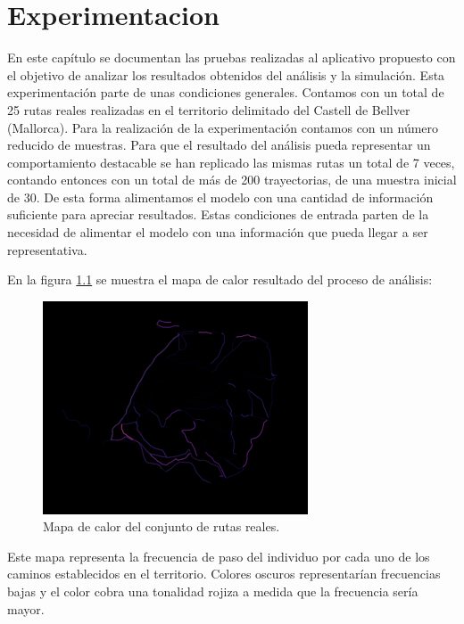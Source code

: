 \chapter{Experimentacion}
En este capítulo se documentan las pruebas realizadas al aplicativo propuesto con el objetivo de analizar los resultados obtenidos del análisis y la simulación.
Esta experimentación parte de unas condiciones generales. Contamos con un total de 25 rutas reales realizadas en el territorio delimitado del Castell de Bellver (Mallorca). Para la realización de la experimentación contamos con un número reducido de muestras. Para que el resultado del análisis pueda representar un comportamiento destacable se han replicado las mismas rutas un total de 7 veces, contando entonces con un total de más de 200 trayectorias, de una muestra inicial de 30. De esta forma alimentamos el modelo con una cantidad de información suficiente para apreciar resultados. Estas condiciones de entrada parten de la necesidad de alimentar el modelo con una información que pueda llegar a ser representativa.

En la figura \ref{figure:RealHeatMap} se muestra el mapa de calor resultado del proceso de análisis:
\begin{figure}[!htb]
\begin{center}
\includegraphics[width=0.7\textwidth]{./Imagenes/HeatMap.png}
\caption{Mapa de calor del conjunto de rutas reales.}
\label{figure:RealHeatMap}
\end{center}
\end{figure}
\newpage
Este mapa representa la frecuencia de paso del individuo por cada uno de los caminos establecidos en 
el territorio. Colores oscuros representarían frecuencias bajas y el color cobra una tonalidad rojiza a 
medida que la frecuencia sería mayor.

